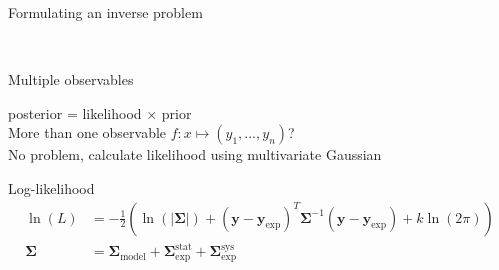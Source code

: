 \documentclass{beamer}
\begin{document}
\begin{frame}{Formulating an inverse problem}
\begin{center}
\\
  \end{center}
\end{frame}


\begin{frame}{Multiple observables}
  \begin{center}
    {\large posterior = likelihood $\times$ prior}\\[2ex]
    More than one observable $f: x \mapsto (y_1, ..., y_n)$?\\
    No problem, calculate likelihood using multivariate Gaussian
  \end{center}
  \begin{block}{Log-likelihood}
    \vspace{-3ex}
    \begin{align*}
      \ln(L) &= -\frac{1}{2}(\ln(|\boldsymbol{\Sigma}|) + (\mathbf{y} - \mathbf{y}_\text{exp})^T \boldsymbol{\Sigma}^{-1} (\mathbf{y} - \mathbf{y}_\text{exp}) + k \ln(2\pi))\\
      \boldsymbol{\Sigma} &= \boldsymbol{\Sigma}_\text{model} + \boldsymbol{\Sigma}_\text{exp}^\text{stat} + \boldsymbol{\Sigma}_\text{exp}^\text{sys}
    \end{align*}
  \end{block}
\end{frame}
\end{document}
